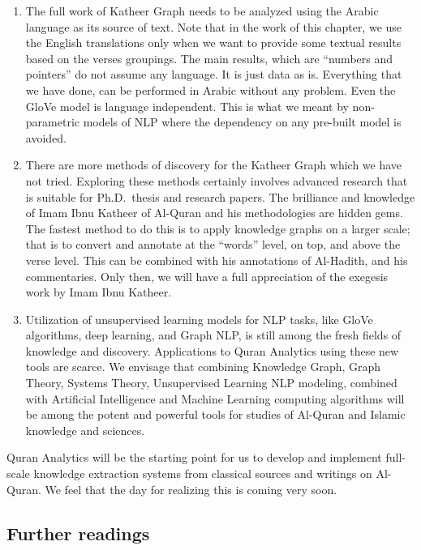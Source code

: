 \documentclass[
]{article}
\begin{document}
\begin{enumerate}
\def\labelenumi{\arabic{enumi}.}
\item
  The full work of Katheer Graph needs to be analyzed using the Arabic language as its source of text. Note that in the work of this chapter, we use the English translations only when we want to provide some textual results based on the verses groupings. The main results, which are ``numbers and pointers'' do not assume any language. It is just data as is. Everything that we have done, can be performed in Arabic without any problem. Even the GloVe model is language independent. This is what we meant by non-parametric models of NLP where the dependency on any pre-built model is avoided.
\item
  There are more methods of discovery for the Katheer Graph which we have not tried. Exploring these methods certainly involves advanced research that is suitable for Ph.D.~thesis and research papers. The brilliance and knowledge of Imam Ibnu Katheer of Al-Quran and his methodologies are hidden gems. The fastest method to do this is to apply knowledge graphs on a larger scale; that is to convert and annotate at the ``words'' level, on top, and above the verse level. This can be combined with his annotations of Al-Hadith, and his commentaries. Only then, we will have a full appreciation of the exegesis work by Imam Ibnu Katheer.
\item
  Utilization of unsupervised learning models for NLP tasks, like GloVe algorithms, deep learning, and Graph NLP, is still among the fresh fields of knowledge and discovery. Applications to Quran Analytics using these new tools are scarce. We envisage that combining Knowledge Graph, Graph Theory, Systems Theory, Unsupervised Learning NLP modeling, combined with Artificial Intelligence and Machine Learning computing algorithms will be among the potent and powerful tools for studies of Al-Quran and Islamic knowledge and sciences.
\end{enumerate}

Quran Analytics will be the starting point for us to develop and implement full-scale knowledge extraction systems from classical sources and writings on Al-Quran. We feel that the day for realizing this is coming very soon.

\hypertarget{further-readings-8}{%
\subsection{Further readings}\label{further-readings-8}}
\end{document}
